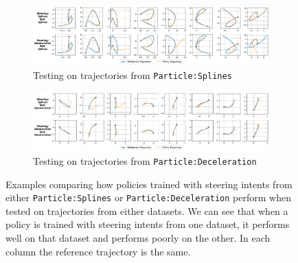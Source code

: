 \documentclass[nohyperref]{article}
\begin{document}
\begin{figure}
    \centering
    \begin{subfigure}{1\textwidth}
        \centering
        \includegraphics[width=\textwidth,keepaspectratio]{figures/iclr_plots/ood_testing_on_splines.png}
        \caption{Testing on trajectories from \texttt{Particle:Splines}}
        \label{fig:drive_towards_desired_splines}
    \end{subfigure}
    \begin{subfigure}{1\textwidth}
        \centering
        \includegraphics[width=\textwidth,keepaspectratio]{figures/iclr_plots/ood_testing_on_deceleration.png}
        \caption{Testing on trajectories from \texttt{Particle:Deceleration}}
        \label{fig:drive_towards_desired_deceleration}
    \end{subfigure}
    \caption{Examples comparing how policies trained with steering intents from either \texttt{Particle:Splines} or \texttt{Particle:Deceleration} perform when tested on trajectories from either datasets. We can see that when a policy is trained with steering intents from one dataset, it performs well on that dataset and performs poorly on the other. In each column the reference trajectory is the same. }
    \label{fig:drive_towards_desired}
\end{figure}
\end{document}
